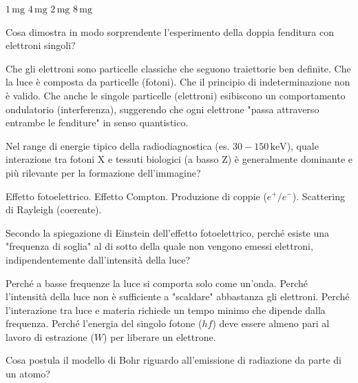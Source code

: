 \documentclass{exam}%
\begin{document}
\begin{questions}
\begin{multicols}{4}
\begin{choices}%
\choice $1 \, \text{mg}$%
\choice $4 \, \text{mg}$%
\choice $2 \, \text{mg}$%
\choice $8 \, \text{mg}$%
\end{choices}%
\end{multicols}%
\question Cosa dimostra in modo sorprendente l'esperimento della doppia fenditura con elettroni singoli?%
\vspace{0.2em}%
\begin{choices}%
\choice Che gli elettroni sono particelle classiche che seguono traiettorie ben definite.%
\choice Che la luce è composta da particelle (fotoni).%
\choice Che il principio di indeterminazione non è valido.%
\choice Che anche le singole particelle (elettroni) esibiscono un comportamento ondulatorio (interferenza), suggerendo che ogni elettrone "passa attraverso entrambe le fenditure" in senso quantistico.%
\end{choices}%
\question Nel range di energie tipico della radiodiagnostica (es. $30-150 \, \text{keV}$), quale interazione tra fotoni X e tessuti biologici (a basso Z) è generalmente dominante e più rilevante per la formazione dell'immagine?%
\vspace{0.2em}%
\begin{multicols}{2}%
\begin{choices}%
\choice Effetto fotoelettrico.%
\choice Effetto Compton.%
\choice Produzione di coppie ($e^+/e^-$).%
\choice Scattering di Rayleigh (coerente).%
\end{choices}%
\end{multicols}%
\question Secondo la spiegazione di Einstein dell'effetto fotoelettrico, perché esiste una "frequenza di soglia" al di sotto della quale non vengono emessi elettroni, indipendentemente dall'intensità della luce?%
\vspace{0.2em}%
\begin{choices}%
\choice Perché a basse frequenze la luce si comporta solo come un'onda.%
\choice Perché l'intensità della luce non è sufficiente a "scaldare" abbastanza gli elettroni.%
\choice Perché l'interazione tra luce e materia richiede un tempo minimo che dipende dalla frequenza.%
\choice Perché l'energia del singolo fotone ($hf$) deve essere almeno pari al lavoro di estrazione ($W$) per liberare un elettrone.%
\end{choices}%
\question Cosa postula il modello di Bohr riguardo all'emissione di radiazione da parte di un atomo?%
\vspace{0.2em}%
\begin{choices}%

\end{choices}
\end{questions}
\end{document}

